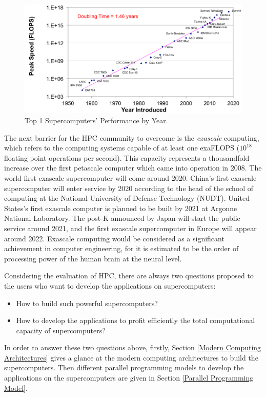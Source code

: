 \begin{figure}[htbp]
	\centering
	\includegraphics[width=6.3in]{fig/sc_evaluate.pdf}
	\caption{Top 1 Supercomputers' Performance by Year.}
		\label{sc_evaluate}
\end{figure}

The next barrier for the HPC community to overcome is the \textit{exascale} computing, which refers to the computing systems capable of at least one exaFLOPS ($10^{18}$ floating point operations per second). This capacity represents a thousandfold increase over the first petascale computer which came into operation in 2008. The world first exascale supercomputer will come around 2020. China's first exascale supercomputer will enter service by 2020 according to the head of the school of computing at the National University of Defense Technology (NUDT). United States's first exascale computer is planned to be built by 2021 at Argonne National Laboratory. The post-K announced by Japan will start the public service around 2021, and the first exascale supercomputer in Europe will appear around 2022. Exascale computing would be considered as a significant achievement in computer engineering, for it is estimated to be the order of processing power of the human brain at the neural level.

Considering the evaluation of HPC, there are always two questions proposed to the users who want to develop the applications on supercomputers:

\begin{itemize}
	\item How to build such powerful supercomputers?
	\item How to develop the applications to profit efficiently the total computational capacity of supercomputers?
\end{itemize}

In order to answer these two questions above, firstly, Section \ref{Modern Computing Architectures} gives a glance at the modern computing architectures to build the supercomputers. Then different parallel programming models to develop the applications on the supercomputers are given in Section \ref{Parallel Programming Model}.


